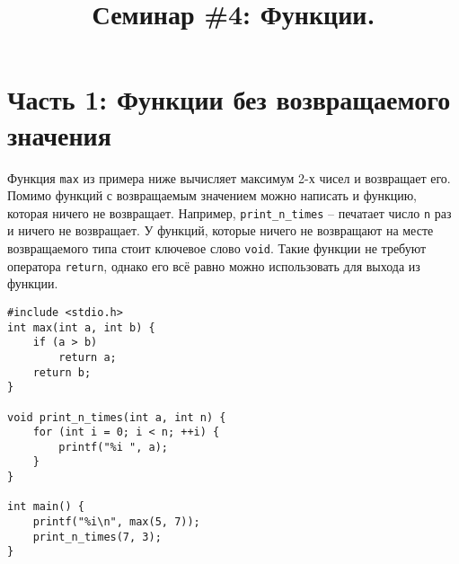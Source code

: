 \documentclass{article}
\begin{document}


\title{Семинар \#4: Функции. \vspace{-5ex}}\date{}\maketitle
\section*{Часть 1: Функции без возвращаемого значения}
Функция \texttt{max} из примера ниже вычисляет максимум 2-х чисел и возвращает его.\\

Помимо функций с возвращаемым значением можно написать и функцию, которая ничего не возвращает. Например, \texttt{print\_n\_times} -- печатает число \texttt{n} раз и ничего не возвращает. У функций, которые ничего не возвращают на месте возвращаемого типа стоит ключевое слово \texttt{void}. Такие функции не требуют оператора \texttt{return}, однако его всё равно можно использовать для выхода из функции.
\begin{lstlisting}
#include <stdio.h>
int max(int a, int b) {
    if (a > b)
        return a;
    return b;
}

void print_n_times(int a, int n) {
    for (int i = 0; i < n; ++i) {
        printf("%i ", a);
    }
}

int main() {
    printf("%i\n", max(5, 7));
    print_n_times(7, 3);
}
\end{lstlisting}
\end{document}
